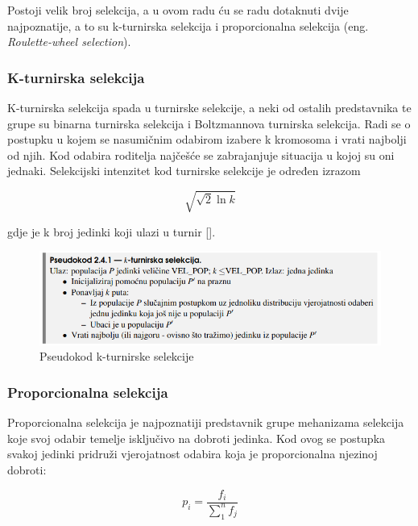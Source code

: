 \documentclass[times, utf8, zavrsni]{fer}
\begin{document}
	Postoji velik broj selekcija, a u ovom radu ću se radu dotaknuti dvije najpoznatije, a to su k-turnirska selekcija i proporcionalna selekcija (eng. \emph{Roulette-wheel selection}).
	
	\subsubsection{K-turnirska selekcija}
	K-turnirska selekcija spada u turnirske selekcije, a neki od ostalih predstavnika te grupe su binarna turnirska selekcija i Boltzmannova turnirska selekcija.
	Radi se o postupku u kojem se nasumičnim odabirom izabere k kromosoma i vrati najbolji od njih. Kod odabira roditelja najčešće se zabrajanjuje situacija u kojoj su oni jednaki. Selekcijski intenzitet kod turnirske selekcije je određen izrazom 
	
	\begin{equation}
		\sqrt{\sqrt{2} \ln{k}}
	\end{equation}
	
	gdje je k broj jedinki koji ulazi u turnir [\citep{Back1995}]. 
	
	\begin{figure}[!htb]
		\centering
		\includegraphics[width=15cm]{slike/kTourSelect.png}
		\caption{Pseudokod k-turnirske selekcije}
		\label{fig:k-tour-select}
	\end{figure}
	
	
	\subsubsection{Proporcionalna selekcija}
	\label{proportional-sel}
	Proporcionalna selekcija je najpoznatiji predstavnik grupe mehanizama selekcija koje svoj odabir temelje isključivo na dobroti jedinka. Kod ovog se postupka svakoj jedinki pridruži vjerojatnost odabira koja je proporcionalna njezinoj dobroti:
	
	\begin{equation}
		p_i=\frac{f_i}{\sum_{1}^{n}f_j}
	\end{equation}
	
\end{document}
